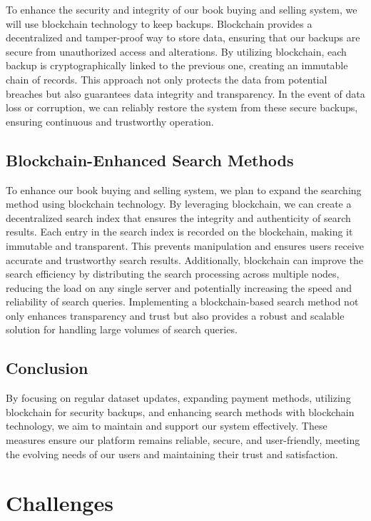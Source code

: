 \documentclass{article}
\begin{document}
To enhance the security and integrity of our book buying and selling system, we will use blockchain technology to keep backups. Blockchain provides a decentralized and tamper-proof way to store data, ensuring that our backups are secure from unauthorized access and alterations. By utilizing blockchain, each backup is cryptographically linked to the previous one, creating an immutable chain of records. This approach not only protects the data from potential breaches but also guarantees data integrity and transparency. In the event of data loss or corruption, we can reliably restore the system from these secure backups, ensuring continuous and trustworthy operation.

\subsection{Blockchain-Enhanced Search Methods}

To enhance our book buying and selling system, we plan to expand the searching method using blockchain technology. By leveraging blockchain, we can create a decentralized search index that ensures the integrity and authenticity of search results. Each entry in the search index is recorded on the blockchain, making it immutable and transparent. This prevents manipulation and ensures users receive accurate and trustworthy search results. Additionally, blockchain can improve the search efficiency by distributing the search processing across multiple nodes, reducing the load on any single server and potentially increasing the speed and reliability of search queries. Implementing a blockchain-based search method not only enhances transparency and trust but also provides a robust and scalable solution for handling large volumes of search queries.

\subsection{Conclusion}

By focusing on regular dataset updates, expanding payment methods, utilizing blockchain for security backups, and enhancing search methods with blockchain technology, we aim to maintain and support our system effectively. These measures ensure our platform remains reliable, secure, and user-friendly, meeting the evolving needs of our users and maintaining their trust and satisfaction.

\section{Challenges}
\end{document}
